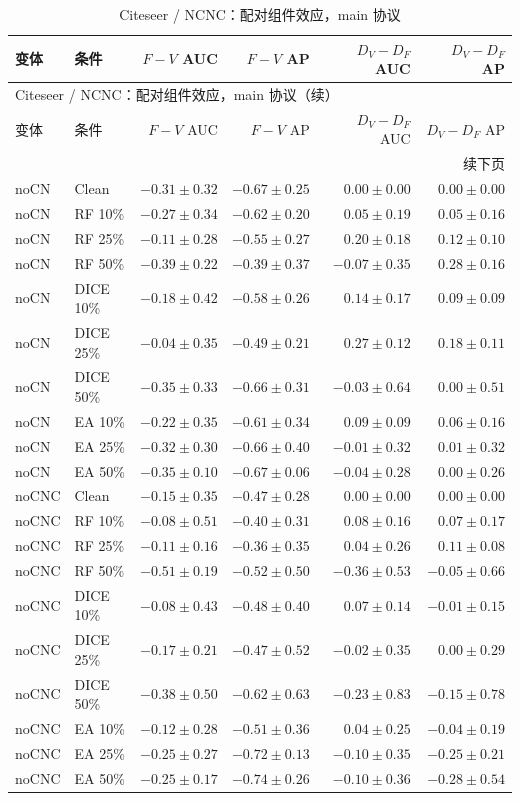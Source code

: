 {\footnotesize
\setlength{\tabcolsep}{3.2pt}
\renewcommand{\arraystretch}{1.10}
\begin{longtable}{llrrrr}
\caption{Citeseer / NCNC：配对组件效应，main 协议}\\
\toprule
变体 & 条件 & $F-V$ AUC & $F-V$ AP & $D_V-D_F$ AUC & $D_V-D_F$ AP \\
\midrule
\endfirsthead
\multicolumn{6}{l}{Citeseer / NCNC：配对组件效应，main 协议（续）}\\
\toprule
变体 & 条件 & $F-V$ AUC & $F-V$ AP & $D_V-D_F$ AUC & $D_V-D_F$ AP \\
\midrule
\endhead
\midrule\multicolumn{6}{r}{续下页}\\
\endfoot
\bottomrule
\endlastfoot
noCN & Clean & $-0.31\pm0.32$ & $-0.67\pm0.25$ & $0.00\pm0.00$ & $0.00\pm0.00$ \\
noCN & RF 10\% & $-0.27\pm0.34$ & $-0.62\pm0.20$ & $0.05\pm0.19$ & $0.05\pm0.16$ \\
noCN & RF 25\% & $-0.11\pm0.28$ & $-0.55\pm0.27$ & $0.20\pm0.18$ & $0.12\pm0.10$ \\
noCN & RF 50\% & $-0.39\pm0.22$ & $-0.39\pm0.37$ & $-0.07\pm0.35$ & $0.28\pm0.16$ \\
noCN & DICE 10\% & $-0.18\pm0.42$ & $-0.58\pm0.26$ & $0.14\pm0.17$ & $0.09\pm0.09$ \\
noCN & DICE 25\% & $-0.04\pm0.35$ & $-0.49\pm0.21$ & $0.27\pm0.12$ & $0.18\pm0.11$ \\
noCN & DICE 50\% & $-0.35\pm0.33$ & $-0.66\pm0.31$ & $-0.03\pm0.64$ & $0.00\pm0.51$ \\
noCN & EA 10\% & $-0.22\pm0.35$ & $-0.61\pm0.34$ & $0.09\pm0.09$ & $0.06\pm0.16$ \\
noCN & EA 25\% & $-0.32\pm0.30$ & $-0.66\pm0.40$ & $-0.01\pm0.32$ & $0.01\pm0.32$ \\
noCN & EA 50\% & $-0.35\pm0.10$ & $-0.67\pm0.06$ & $-0.04\pm0.28$ & $0.00\pm0.26$ \\
noCNC & Clean & $-0.15\pm0.35$ & $-0.47\pm0.28$ & $0.00\pm0.00$ & $0.00\pm0.00$ \\
noCNC & RF 10\% & $-0.08\pm0.51$ & $-0.40\pm0.31$ & $0.08\pm0.16$ & $0.07\pm0.17$ \\
noCNC & RF 25\% & $-0.11\pm0.16$ & $-0.36\pm0.35$ & $0.04\pm0.26$ & $0.11\pm0.08$ \\
noCNC & RF 50\% & $-0.51\pm0.19$ & $-0.52\pm0.50$ & $-0.36\pm0.53$ & $-0.05\pm0.66$ \\
noCNC & DICE 10\% & $-0.08\pm0.43$ & $-0.48\pm0.40$ & $0.07\pm0.14$ & $-0.01\pm0.15$ \\
noCNC & DICE 25\% & $-0.17\pm0.21$ & $-0.47\pm0.52$ & $-0.02\pm0.35$ & $0.00\pm0.29$ \\
noCNC & DICE 50\% & $-0.38\pm0.50$ & $-0.62\pm0.63$ & $-0.23\pm0.83$ & $-0.15\pm0.78$ \\
noCNC & EA 10\% & $-0.12\pm0.28$ & $-0.51\pm0.36$ & $0.04\pm0.25$ & $-0.04\pm0.19$ \\
noCNC & EA 25\% & $-0.25\pm0.27$ & $-0.72\pm0.13$ & $-0.10\pm0.35$ & $-0.25\pm0.21$ \\
noCNC & EA 50\% & $-0.25\pm0.17$ & $-0.74\pm0.26$ & $-0.10\pm0.36$ & $-0.28\pm0.54$ \\
\end{longtable}
}

